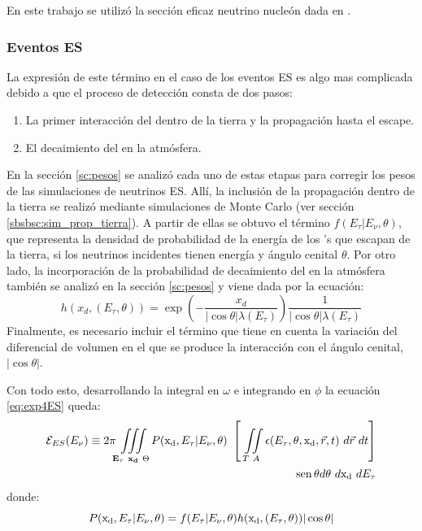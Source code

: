 	En este trabajo se utilizó la sección eficaz neutrino nucleón dada en \cite{cite:cooper_sarkar}.
	
	\subsubsection{Eventos ES}
	
	La expresión de este término en el caso de los eventos ES es algo mas complicada debido a que el proceso de detección consta de dos pasos:
	\begin{enumerate}
	 \item La primer interacción del \nutau{} dentro de la tierra y la propagación hasta el escape.
	 \item El decaimiento del \tauon{} en la atmósfera.
	\end{enumerate}
	
	En la sección \ref{sc:pesos} se analizó cada uno de estas etapas para corregir los pesos de las simulaciones de neutrinos ES.
	All\'i, la inclusión de la propagación dentro de la tierra se realizó mediante simulaciones de Monte Carlo (ver sección \ref{sbsbsc:sim_prop_tierra}).
	A partir de ellas se obtuvo el término $f(E_\tau|E_\nu,\theta)$, que representa la densidad de probabilidad de la energía de los \tauon{}'s que escapan de la tierra, si los neutrinos incidentes tienen energía \enu{} y ángulo cenital $\theta$.
	Por otro lado, la incorporación de la probabilidad de decaimiento del \tauon{} en la atmósfera también se analizó en la sección \ref{sc:pesos} y viene dada por la ecuación:
	\begin{equation}
		h(x_d,(E_\tau,\theta))=
		\exp{\left(
		-\frac{x_d}{|\cos\theta|\lambda(E_\tau)}
		\right)}
		\frac{1}{|\cos\theta|\lambda(E_\tau)}
		\label{eq:h_xd}
	\end{equation}
	Finalmente, es necesario incluir el término que tiene en cuenta la variación del diferencial de volumen en el que se produce la interacción con el ángulo cenital, $|\cos\theta|$.
	
	Con todo esto, desarrollando la integral en $\omega$ e integrando en $\phi$ la ecuación \ref{eq:exp4ES} queda:
	\begin{equation}
	\begin{aligned}
	 {\cal E}_{ES}(E_\nu)\equiv2\pi\iiint\limits_{\mathbf{E_\tau}~\mathbf{x_d}~\Theta}P({\rm x_d},E_\tau|E_{\nu},\theta)~
	 \left[~
	 \iint\limits_{T~A}\epsilon(E_\tau,\theta,{\rm x_d},\vec{r},t)~d\vec{r}~dt
	 \right]\\
	 ~\operatorname{sen}\theta d\theta~d{\rm x_d}~dE_\tau
	 \end{aligned}
	 \label{eq:exp5ES}
	\end{equation}
	donde:
	\begin{equation}
	 P({\rm x_d},E_\tau|E_{\nu},\theta)=
	 f(E_\tau|E_\nu,\theta)
	 h({\rm x_d},(E_\tau,\theta))
	 |\cos\theta|
	 \label{eq:exp5.2ES}
	\end{equation}
	
